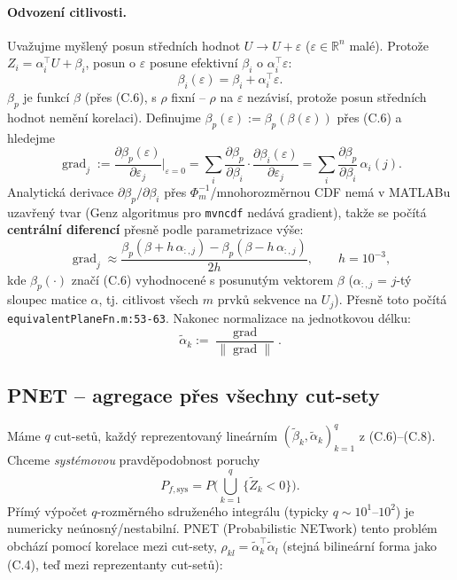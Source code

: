 \documentclass[11pt,a4paper]{article}
\newcommand{\R}{\mathbb{R}}
\newcommand{\code}[1]{\texttt{#1}}
\begin{document}
\paragraph{Odvození citlivosti.} Uvažujme myšlený posun středních hodnot $U\to U+\varepsilon$
($\varepsilon\in\R^n$ malé). Protože $Z_i=\alpha_i^\top U+\beta_i$, posun o $\varepsilon$ posune
efektivní $\beta_i$ o $\alpha_i^\top\varepsilon$:
\[
  \beta_i(\varepsilon) = \beta_i + \alpha_i^\top \varepsilon.
\]
$\beta_p$ je funkcí $\beta$ (přes (C.6), s $\rho$ fixní -- $\rho$ na $\varepsilon$ nezávisí, protože
posun středních hodnot nemění korelaci). Definujme $\beta_p(\varepsilon) := \beta_p(\beta(\varepsilon))$
přes (C.6) a hledejme
\[
  \operatorname{grad}_j := \frac{\partial \beta_p(\varepsilon)}{\partial \varepsilon_j}\bigg|_{\varepsilon=0}
  = \sum_i \frac{\partial\beta_p}{\partial\beta_i}\cdot\frac{\partial\beta_i(\varepsilon)}{\partial\varepsilon_j}
  = \sum_i \frac{\partial\beta_p}{\partial\beta_i}\,\alpha_i(j).
\]
Analytická derivace $\partial\beta_p/\partial\beta_i$ přes $\Phi_m^{-1}$/mnohorozměrnou CDF nemá v MATLABu
uzavřený tvar (Genz algoritmus pro \code{mvncdf} nedává gradient), takže se počítá
\textbf{centrální diferencí} přesně podle parametrizace výše:
\[
  \operatorname{grad}_j \approx \frac{\beta_p(\beta + h\,\alpha_{:,j}) - \beta_p(\beta - h\,\alpha_{:,j})}{2h},
  \qquad h=10^{-3},
\tag{C.7}
\]
kde $\beta_p(\cdot)$ značí (C.6) vyhodnocené s posunutým vektorem $\beta$ ($\alpha_{:,j}$ = $j$-tý
sloupec matice $\alpha$, tj. citlivost všech $m$ prvků sekvence na $U_j$). Přesně toto počítá
\code{equivalentPlaneFn.m:53-63}. Nakonec normalizace na jednotkovou délku:
\[
  \tilde\alpha_k := \frac{\operatorname{grad}}{\|\operatorname{grad}\|}. \tag{C.8}
\]

\subsection{PNET -- agregace přes všechny cut-sety}
\label{sec:c5}

Máme $q$ cut-setů, každý reprezentovaný lineárním $(\tilde\beta_k,\tilde\alpha_k)_{k=1}^q$ z
(C.6)--(C.8). Chceme \emph{systémovou} pravděpodobnost poruchy
\[
  P_{f,\mathrm{sys}} = P\Big(\bigcup_{k=1}^q \{\tilde Z_k < 0\}\Big).
\]
Přímý výpočet $q$-rozměrného sdruženého integrálu (typicky $q\sim10^1$--$10^2$) je numericky
neúnosný/nestabilní. PNET (Probabilistic NETwork) tento problém obchází pomocí korelace mezi cut-sety,
$\rho_{kl} = \tilde\alpha_k^\top\tilde\alpha_l$ (stejná bilineární forma jako (C.4), teď mezi
reprezentanty cut-setů):
\end{document}
